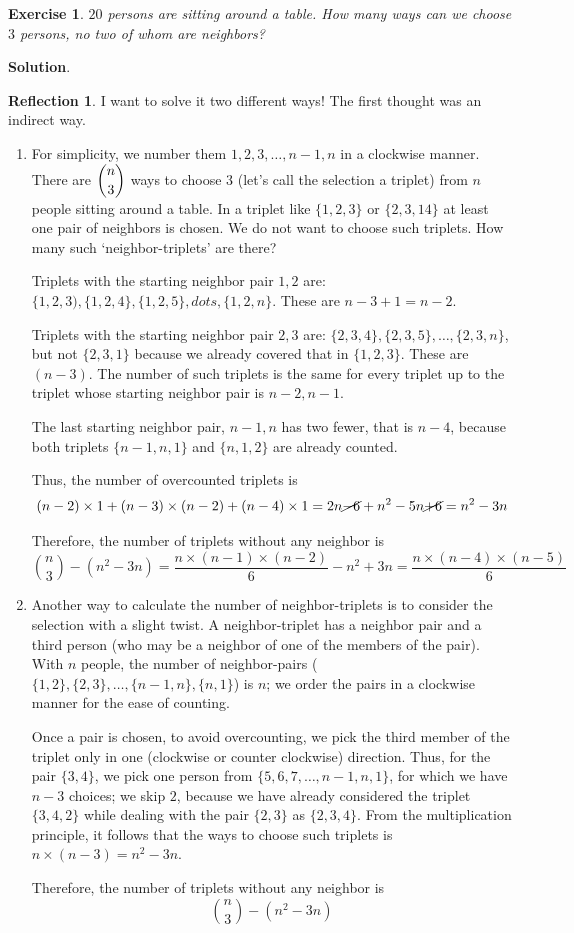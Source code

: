 \documentclass[11pt]{book}
\theoremstyle{definition}
\theoremstyle{plain}
\newtheorem{exercise}{Exercise}
\theoremstyle{definition}
\theoremstyle{problemstyle}
\theoremstyle{remark}
\theoremstyle{definition}
\newtheorem{reflection}{Reflection}
\begin{document}
\begin{exercise}
    \label{ex:1.8.34}
    $20$ persons are sitting around a table. How many ways can we choose $3$ persons, no two of whom are neighbors?
\end{exercise}
\textbf{Solution}.
\begin{reflection}
    I want to solve it two different ways! The first thought was an indirect way.
\end{reflection}
\begin{enumerate}[label=(\alph*)]
    \item For simplicity, we number them $1,2,3,\dots,n-1,n$ in a clockwise manner. There are $\dbinom{n}{3}$ ways to choose $3$ (let's call the selection a triplet) from $n$ people sitting around a table. In a triplet like $\{1,2,3\}$ or $\{2,3,14\}$ at least one pair of neighbors is chosen. We do not want to choose such triplets. How many such `neighbor-triplets' are there? 

        Triplets with the starting neighbor pair $1,2$ are: $\{1,2,3),\{1,2,4\},\{1,2,5\},dots,\{1,2,n\}$. These are $n-3+1=n-2$.

        Triplets with the starting neighbor pair $2,3$ are: $\{2,3,4\},\{2,3,5\},\dots,\{2,3,n\}$, but not $\{2,3,1\}$ because we already covered that in $\{1,2,3\}$. These are $(n-3)$. The number of such triplets is the same for every triplet up to the triplet whose starting neighbor pair is $n-2,n-1$. 

        The last starting neighbor pair, $n-1,n$ has two fewer, that is $n-4$, because both triplets $\{n-1,n,1\}$ and $\{n,1,2\}$ are already counted.

        Thus, the number of overcounted triplets is
        \[
            (n-2)\times1+(n-3)\times(n-2)+(n-4)\times1=2n\cancel{-6}+n^2-5n\cancel{+6}=n^2-3n
        \]

        Therefore, the number of triplets without any neighbor is
        \[
            \binom{n}{3}-(n^2-3n)=\frac{n\times(n-1)\times(n-2)}{6}-n^2+3n=\frac{n\times(n-4)\times(n-5)}{6}
        \]
    \item Another way to calculate the number of neighbor-triplets is to consider the selection with a slight twist. A neighbor-triplet has a neighbor pair and a third person (who may be a neighbor of one of the members of the pair). With $n$ people, the number of neighbor-pairs ($\{1,2\},\{2,3\},\dots,\{n-1,n\},\{n,1\}$) is $n$; we order the pairs in a clockwise manner for the ease of counting. 

        Once a pair is chosen, to avoid overcounting, we pick the third member of the triplet only in one (clockwise or counter clockwise) direction. Thus, for the pair $\{3,4\}$, we pick one person from $\{5,6,7,\dots,n-1,n,1\}$, for which we have $n-3$ choices; we skip $2$, because we have already considered the triplet $\{3,4,2\}$ while dealing with the pair $\{2,3\}$ as $\{2,3,4\}$. From the multiplication principle, it follows that the ways to choose such triplets is $n\times(n-3)=n^2-3n$.

        Therefore, the number of triplets without any neighbor is
        \[
            \binom{n}{3}-(n^2-3n)
        \]

\end{enumerate}
\end{document}
